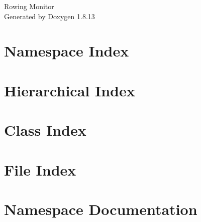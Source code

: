\documentclass[twoside]{book}
\newcommand{\+}{\discretionary{\mbox{\scriptsize$\hookleftarrow$}}{}{}}
\newcommand{\clearemptydoublepage}{%
  \newpage{\pagestyle{empty}\cleardoublepage}%
}
\begin{document}
\hypersetup{pageanchor=false,
             bookmarksnumbered=true,
             pdfencoding=unicode
            }
\begin{titlepage}
\vspace*{7cm}
\begin{center}%
{\Large Rowing Monitor }\\
\vspace*{1cm}
{\large Generated by Doxygen 1.8.13}\\
\end{center}
\end{titlepage}
\clearemptydoublepage
{}
\tableofcontents
\clearemptydoublepage
{}
\hypersetup{pageanchor=true}

\chapter{Namespace Index}

\chapter{Hierarchical Index}

\chapter{Class Index}

\chapter{File Index}

\chapter{Namespace Documentation}







\end{document}
